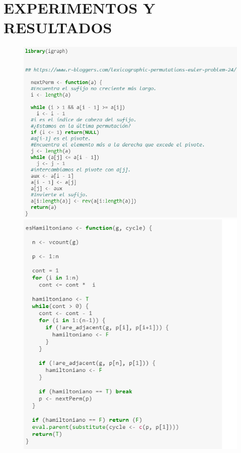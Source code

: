 \documentclass[journal]{IEEEtran}
\begin{document}
\section{\Large{\bf EXPERIMENTOS Y RESULTADOS}}
\begin{figure}
	\includegraphics[scale=0.5]{parte_1.PNG}
	\includegraphics[scale=0.5]{parte_2.PNG}

\end{figure}
\end{document}
